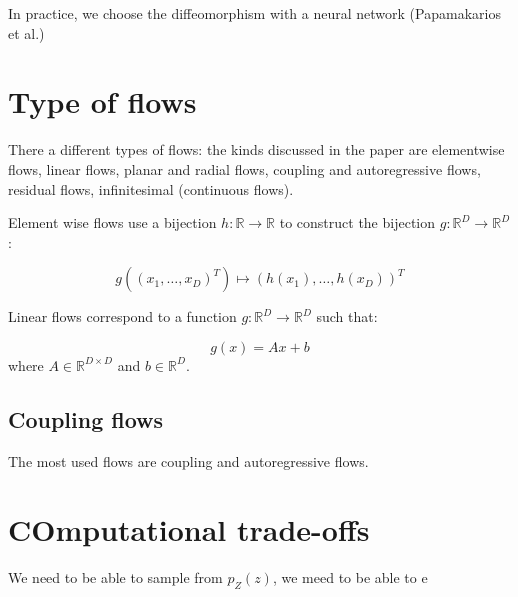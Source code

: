 \documentclass{article}
\theoremstyle{definition}
\theoremstyle{definition}
\theoremstyle{remark}
\begin{document}
In practice, we choose the diffeomorphism with a neural network (Papamakarios et al.)

\section{Type of flows}

There a different types of flows: the kinds discussed in the paper are elementwise flows, linear flows, planar and radial flows, coupling and autoregressive flows, residual flows, infinitesimal (continuous flows).

Element wise flows use a bijection $h: \mathbb{R} \rightarrow \mathbb{R}$ to construct the bijection $g: \mathbb{R}^D \rightarrow \mathbb{R}^D$:

$$ g((x_1, \dots, x_D)^T) \mapsto (h(x_1), \dots, h(x_D))^T $$

Linear flows correspond to a function $g: \mathbb{R}^D \rightarrow \mathbb{R}^D$ such that:

$$ g(x)=Ax+b$$
where $A \in \mathbb{R}^{D\times D}$ and $b \in \mathbb{R}^{D}$.

\subsection{Coupling flows}

The most used flows are coupling and autoregressive flows.

\section{COmputational trade-offs}

We need to be able to sample from $p_Z(z)$, we meed to be able to e 
\end{document}
